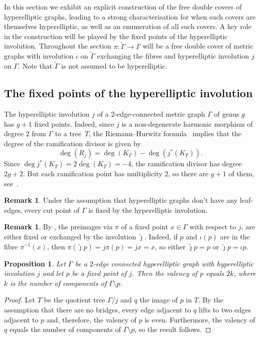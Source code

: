 \documentclass[11pt]{article}
\newtheorem{prop}[theo]{Proposition}
\theoremstyle{definition}
\newtheorem{rema}[theo]{Remark}
\numberwithin{equation}{section}
\theoremstyle{definition}
\newcommand{\tGa}{\widetilde{\Gamma}}
\newcommand{\Ga}{\Gamma}
\newcommand{\tj}{\widetilde{\jmath}}
\begin{document}
{  
In this section we exhibit an explicit construction of the free double covers of hyperelliptic graphs, leading to a strong characterisation for when such covers are themselves hyperelliptic, as well as an enumeration of all such covers. 
A key role in the construction will be played by the fixed points of the hyperelliptic involution. 
Throughout the section  $\pi\colon \tGa\to \Gamma$ will be a free double cover of metric graphs with involution $\iota$ on $\tGa$ exchanging the fibres and hyperelliptic involution $j$ on $\Ga$. Note that $\tGa$ is not assumed to be hyperelliptic. 


\subsection{The fixed points of the hyperelliptic involution}\label{sec:fixedpoints}
    The hyperelliptic involution  $j$ of a 2-edge-connected metric graph $\Gamma$ of genus $g$ has $g+1$ fixed points. Indeed, since $j$ is a non-degenerate harmonic morphism of degree $2$ from $\Gamma$ to a tree~$T$, the Riemann--Hurwitz formula~\cite[Section 2.10]{ABBR} implies that
 the degree of the ramification divisor is given by
\begin{equation}\label{numberOfFixedPoints}
        \deg(R_j)=\deg(K_{\Gamma})-\deg(j^*(K_T)).
    \end{equation}
    Since $\deg j^*(K_T)=2\deg(K_T)=-4$, the ramification divisor has degree $2g+2$. But each ramification point has multiplicity 2, so there are $g+1$ of them, see~\cite[Proposition 9]{Panizzut}.
    
\begin{rema}
 Under the assumption that hyperelliptic graphs don't have any leaf-edges, every cut point of $\Gamma$ is fixed by the hyperelliptic involution. 

\end{rema}


\begin{rema}\label{rem:onlytwochoicesfortheinvolution}
By , the preimages via $\pi$ of a fixed point $x\in \Ga$ with respect to $j$, are either fixed  or exchanged by the involution $\tj$. Indeed, if $p$ and $\iota(p)$ are in the fibre $\pi^{-1}(x)$, then 
 $\pi(\tj p) = j \pi (p) = j x = x$, so either $\tj p = p$  or $\tj p=\iota p$. 
\end{rema}


\begin{prop}\label{prop:valencyoffixedpoints}
    Let $\Gamma$ be a $2$-edge connected hyperelliptic graph  with hyperelliptic involution $j$ and let $p$ be a fixed point of $j$. Then the valency of $p$ equals $2k$, where $k$ is the number of components of $\Gamma\setminus{p}$.
\end{prop}
\begin{proof}
Let $T$ be the quotient tree $\Gamma/j$ and $q$ the image of $p$ in $T$. By the assumption that there are no bridges, every edge adjacent to $q$ lifts to two edges adjacent to $p$ and, therefore, the valency of $p$ is even. Furthermore, the valency of $q$ equals the number of components of $\Gamma\setminus{p}$, so the result follows. 
\end{proof}

}
\end{document}
